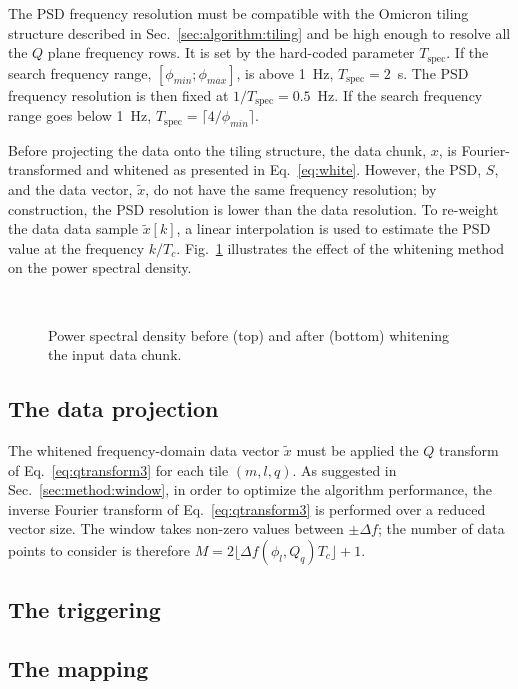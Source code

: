 The PSD frequency resolution must be compatible with the Omicron tiling structure described in Sec.~\ref{sec:algorithm:tiling} and be high enough to resolve all the $Q$ plane frequency rows. It is set by the hard-coded parameter $T_\mathrm{spec}$. If the search frequency range, $[\phi_{min}; \phi_{max}]$, is above 1~Hz, $T_\mathrm{spec}=2$~s. The PSD frequency resolution is then fixed at $1/T_\mathrm{spec}=0.5$~Hz. If the search frequency range goes below 1~Hz, $T_\mathrm{spec}=\lceil4/\phi_{min}\rceil$.

Before projecting the data onto the tiling structure, the data chunk, $x$, is Fourier-transformed and whitened as presented in Eq.~\ref{eq:white}. However, the PSD, $S$, and the data vector, $\tilde{x}$, do not have the same frequency resolution; by construction, the PSD resolution is lower than the data resolution.  To re-weight the data data sample $\tilde{x}[k]$, a linear interpolation is used to estimate the PSD value at the frequency $k/T_c$. Fig.~\ref{fig:white} illustrates the effect of the whitening method on the power spectral density. 
\begin{figure}
  \center
   \\
  \caption{Power spectral density before (top) and after (bottom) whitening the input data chunk.}
  \label{fig:white}
\end{figure}

\subsection{The data projection} \label{sec:algorithm:projection}

The whitened frequency-domain data vector $\tilde{x}$ must be applied the $Q$ transform of Eq.~\ref{eq:qtransform3} for each tile $(m, l, q)$. As suggested in Sec.~\ref{sec:method:window}, in order to optimize the algorithm performance, the inverse Fourier transform of Eq.~\ref{eq:qtransform3} is performed over a reduced vector size. The window takes non-zero values between $\pm \Delta f$; the number of data points to consider is therefore $M=2\lfloor \Delta f(\phi_l,Q_q) T_c \rfloor + 1$.


\subsection{The triggering} \label{sec:algorithm:triggering}

\subsection{The mapping} \label{sec:algorithm:mapping}

